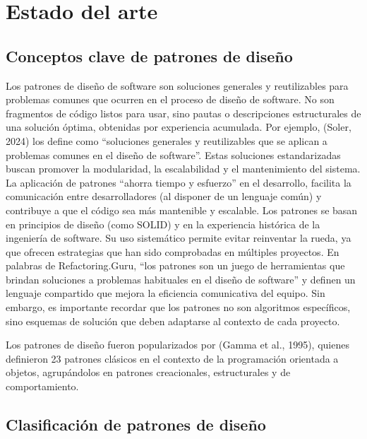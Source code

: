 \documentclass[
  11pt,
  letterpaper,
]{article}
\begin{document}
\newpage

\section{Estado del arte}\label{estado-del-arte}

\subsection{Conceptos clave de patrones de
diseño}\label{conceptos-clave-de-patrones-de-diseuxf1o}

Los patrones de diseño de software son soluciones generales y
reutilizables para problemas comunes que ocurren en el proceso de diseño
de software. No son fragmentos de código listos para usar, sino pautas o
descripciones estructurales de una solución óptima, obtenidas por
experiencia acumulada. Por ejemplo, (Soler, 2024) los define como
``soluciones generales y reutilizables que se aplican a problemas
comunes en el diseño de software''. Estas soluciones estandarizadas
buscan promover la modularidad, la escalabilidad y el mantenimiento del
sistema. La aplicación de patrones ``ahorra tiempo y esfuerzo'' en el
desarrollo, facilita la comunicación entre desarrolladores (al disponer
de un lenguaje común) y contribuye a que el código sea más mantenible y
escalable. Los patrones se basan en principios de diseño (como SOLID) y
en la experiencia histórica de la ingeniería de software. Su uso
sistemático permite evitar reinventar la rueda, ya que ofrecen
estrategias que han sido comprobadas en múltiples proyectos. En palabras
de Refactoring.Guru, ``los patrones son un juego de herramientas que
brindan soluciones a problemas habituales en el diseño de software'' y
definen un lenguaje compartido que mejora la eficiencia comunicativa del
equipo. Sin embargo, es importante recordar que los patrones no son
algoritmos específicos, sino esquemas de solución que deben adaptarse al
contexto de cada proyecto.

Los patrones de diseño fueron popularizados por (Gamma et al., 1995),
quienes definieron 23 patrones clásicos en el contexto de la
programación orientada a objetos, agrupándolos en patrones creacionales,
estructurales y de comportamiento.

\subsection{Clasificación de patrones de
diseño}\label{clasificaciuxf3n-de-patrones-de-diseuxf1o}
\end{document}
